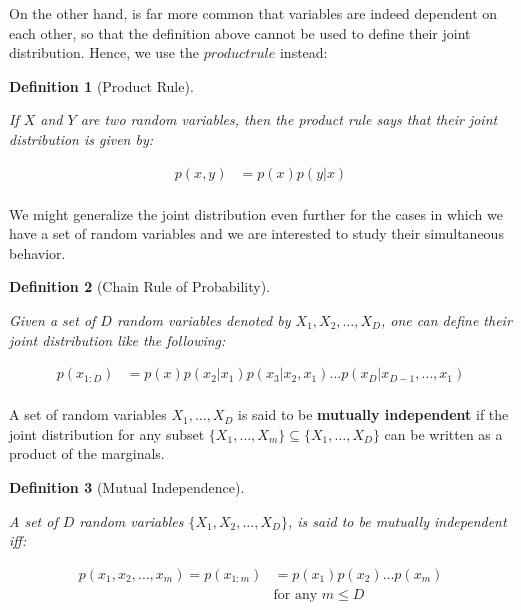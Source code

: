 \documentclass{article}
\newtheorem{definition}{Definition}[section]
\begin{document}
On the other hand, is far more common that variables are indeed dependent on each other, so that the definition above cannot be used to define their joint distribution. Hence, we use the $product rule$ instead:


\begin{definition}[Product Rule]
	\label{def:prod_rule}
	
	If $X$ and $Y$ are two random variables, then the product rule says that their joint distribution is given by:
	
	\begin{align}
		p(x,y) &= p(x)p(y|x)\\
	\end{align}
	
\end{definition}


We might generalize the joint distribution even further for the cases in which we have a set of random variables and we are interested to study their simultaneous behavior.

\begin{definition}[Chain Rule of Probability]
	\label{def:cahin_rule_prob}
	
	Given a set of $D$ random variables denoted by $X_1, X_2, \hdots, X_D$, one can define their joint distribution like the following:
	
	\begin{align}
		p(x_{1:D}) &= p(x)p(x_2|x_1)p(x_3| x_2, x_1)\hdots p(x_D|x_{D-1}, \hdots, x_1)\\
	\end{align}
	
\end{definition}

A set of random variables $X_1, \hdots, X_D$ is said to be \textbf{mutually independent} if the joint distribution for any subset $\{X_1, \hdots, X_m\}\subseteq \{X_1, \hdots, X_D\}$ can be written as a product of the marginals.

\begin{definition}[Mutual Independence]
	\label{def:mututal_indep}
	
	A set of $D$ random variables $\{X_1, X_2, \hdots, X_D\}$, is said to be mutually independent iff:
	
	\begin{align}
		p(x_1, x_2, \hdots, x_m) = p(x_{1:m}) &= p(x_1)p(x_2)\hdots p(x_m)\\
		&\text{for any  } m \leq D
	\end{align}
	
\end{definition}
\end{document}
